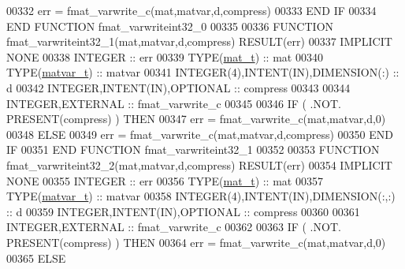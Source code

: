 \begin{DoxyCode}
00332         err = fmat\_varwrite\_c(mat,matvar,d,compress)
00333 \textcolor{keywordflow}{    END IF}
00334 \textcolor{keyword}{END FUNCTION }fmat\_varwriteint32\_0
00335 
00336 \textcolor{keyword}{FUNCTION }fmat\_varwriteint32\_1(mat,matvar,d,compress) \textcolor{keyword}{RESULT}(err)
00337 \textcolor{keywordtype}{IMPLICIT NONE}
00338     \textcolor{keywordtype}{INTEGER}                                  :: err
00339     \textcolor{keywordtype}{TYPE}(\hyperlink{group___m_a_t_gab0fc888f5a5d79943b16284b1f91c2e8}{mat\_t})                              :: mat
00340     \textcolor{keywordtype}{TYPE}(\hyperlink{group___m_a_t_structmatvar__t}{matvar\_t})                           :: matvar
00341     \textcolor{keywordtype}{INTEGER(4)},\textcolor{keywordtype}{INTENT(IN)},\textcolor{keywordtype}{DIMENSION(:)}       :: d
00342     \textcolor{keywordtype}{INTEGER},\textcolor{keywordtype}{INTENT(IN)},\textcolor{keywordtype}{OPTIONAL}              :: compress
00343 
00344     \textcolor{keywordtype}{INTEGER},\textcolor{keywordtype}{EXTERNAL}                         :: fmat\_varwrite\_c
00345 
00346     \textcolor{keywordflow}{IF} ( .NOT. \textcolor{keyword}{PRESENT}(compress) ) \textcolor{keywordflow}{THEN}
00347         err = fmat\_varwrite\_c(mat,matvar,d,0)
00348     \textcolor{keywordflow}{ELSE}
00349         err = fmat\_varwrite\_c(mat,matvar,d,compress)
00350 \textcolor{keywordflow}{    END IF}
00351 \textcolor{keyword}{END FUNCTION }fmat\_varwriteint32\_1
00352 
00353 \textcolor{keyword}{FUNCTION }fmat\_varwriteint32\_2(mat,matvar,d,compress) \textcolor{keyword}{RESULT}(err)
00354 \textcolor{keywordtype}{IMPLICIT NONE}
00355     \textcolor{keywordtype}{INTEGER}                                  :: err
00356     \textcolor{keywordtype}{TYPE}(\hyperlink{group___m_a_t_gab0fc888f5a5d79943b16284b1f91c2e8}{mat\_t})                              :: mat
00357     \textcolor{keywordtype}{TYPE}(\hyperlink{group___m_a_t_structmatvar__t}{matvar\_t})                           :: matvar
00358     \textcolor{keywordtype}{INTEGER(4)},\textcolor{keywordtype}{INTENT(IN)},\textcolor{keywordtype}{DIMENSION(:,:)}     :: d
00359     \textcolor{keywordtype}{INTEGER},\textcolor{keywordtype}{INTENT(IN)},\textcolor{keywordtype}{OPTIONAL}              :: compress
00360 
00361     \textcolor{keywordtype}{INTEGER},\textcolor{keywordtype}{EXTERNAL}                         :: fmat\_varwrite\_c
00362 
00363     \textcolor{keywordflow}{IF} ( .NOT. \textcolor{keyword}{PRESENT}(compress) ) \textcolor{keywordflow}{THEN}
00364         err = fmat\_varwrite\_c(mat,matvar,d,0)
00365     \textcolor{keywordflow}{ELSE}

\end{DoxyCode}
